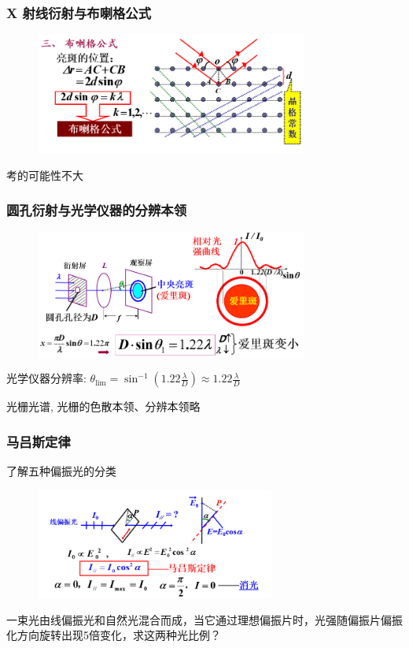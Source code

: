 \documentclass[UTF8]{ctexbeamer}
\begin{document}
\begin{frame}
	\frametitle{X 射线衍射与布喇格公式}
	\begin{figure}[!ht]
		\centering
		\includegraphics[width=0.8\textwidth]{26}
	\end{figure}
	考的可能性不大
\end{frame}
\begin{frame}
	\frametitle{圆孔衍射与光学仪器的分辨本领}
	\begin{figure}[!ht]
		\centering
		\includegraphics[width=0.8\textwidth]{27}
	\end{figure}
	光学仪器分辨率:
	${\theta}_{\lim}=\sin^{-1}\left(1.22\frac\lambda D\right)\boldsymbol{\approx}1.22\frac\lambda D$
	
	光栅光谱, 光栅的色散本领、分辨本领略
	
\end{frame}
\begin{frame}
\frametitle{马吕斯定律}
了解五种偏振光的分类
	\begin{figure}[!ht]
	\centering
	\includegraphics[width=0.7\textwidth]{28}
\end{figure}
\begin{examples}
	一束光由线偏振光和自然光混合而成，当它通过理想偏振片时，光强随偏振片偏振化方向旋转出现5倍变化，求这两种光比例？
\end{examples}
\end{frame}
\end{document}
